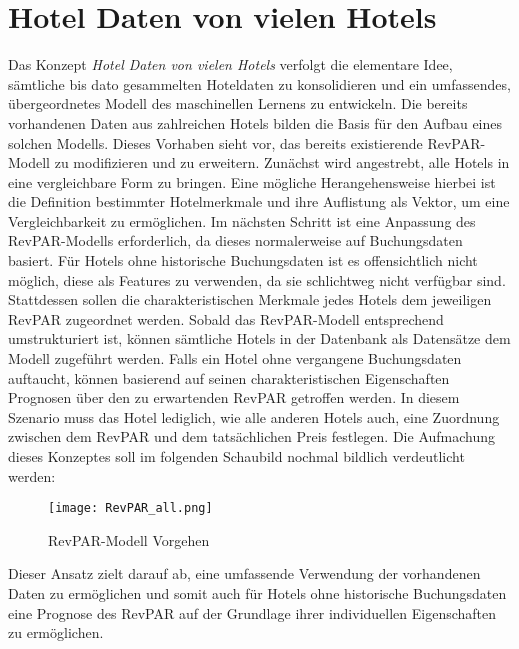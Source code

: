 \section{Hotel Daten von vielen Hotels}
\label{sec:all_Hotels}
Das Konzept \emph{Hotel Daten von vielen Hotels} verfolgt die elementare Idee, sämtliche bis dato gesammelten Hoteldaten zu konsolidieren und ein umfassendes, übergeordnetes Modell des maschinellen Lernens zu entwickeln.
\newline
\newline
Die bereits vorhandenen Daten aus zahlreichen Hotels bilden die Basis für den Aufbau eines solchen Modells. Dieses Vorhaben sieht vor, das bereits existierende RevPAR-Modell zu modifizieren und zu erweitern. Zunächst wird angestrebt, alle Hotels in eine vergleichbare Form zu bringen. Eine mögliche Herangehensweise hierbei ist die Definition bestimmter Hotelmerkmale und ihre Auflistung als Vektor, um eine Vergleichbarkeit zu ermöglichen.
\newline
\newline
Im nächsten Schritt ist eine Anpassung des RevPAR-Modells erforderlich, da dieses normalerweise auf Buchungsdaten basiert. Für Hotels ohne historische Buchungsdaten ist es offensichtlich nicht möglich, diese als Features zu verwenden, da sie schlichtweg nicht verfügbar sind. Stattdessen sollen die charakteristischen Merkmale jedes Hotels dem jeweiligen RevPAR zugeordnet werden.
\newline
\newline
Sobald das RevPAR-Modell entsprechend umstrukturiert ist, können sämtliche Hotels in der Datenbank als Datensätze dem Modell zugeführt werden. Falls ein Hotel ohne vergangene Buchungsdaten auftaucht, können basierend auf seinen charakteristischen Eigenschaften Prognosen über den zu erwartenden RevPAR getroffen werden. In diesem Szenario muss das Hotel lediglich, wie alle anderen Hotels auch, eine Zuordnung zwischen dem RevPAR und dem tatsächlichen Preis festlegen.
\newline
\newline
Die Aufmachung dieses Konzeptes soll im folgenden Schaubild nochmal bildlich verdeutlicht werden:
\begin{figure}[h]
    \centering
    \texttt{[image: RevPAR\_all.png]}
    \caption[RevPAR-Modell Vorgehen]{RevPAR-Modell Vorgehen}
    \label{img:all_hotels}
\end{figure}

Dieser Ansatz zielt darauf ab, eine umfassende Verwendung der vorhandenen Daten zu ermöglichen und somit auch für Hotels ohne historische Buchungsdaten eine Prognose des RevPAR auf der Grundlage ihrer individuellen Eigenschaften zu ermöglichen.
